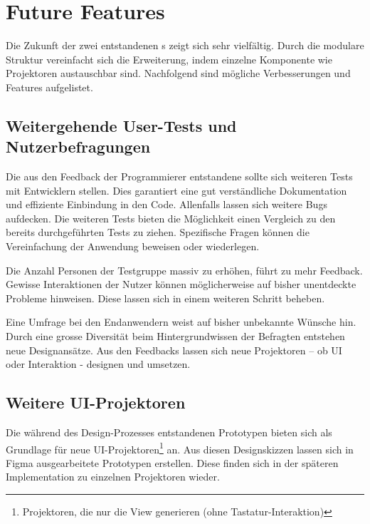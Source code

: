 \section{Future Features}
\label{sec:future}

Die Zukunft der zwei entstandenen s zeigt sich sehr vielfältig. 
Durch die modulare Struktur vereinfacht sich die Erweiterung, indem einzelne Komponente wie Projektoren austauschbar sind. 
Nachfolgend sind mögliche Verbesserungen und Features aufgelistet. 


\subsection{Weitergehende User-Tests und Nutzerbefragungen}
\label{sec:moreUserTests}

Die aus den Feedback der Programmierer entstandene  sollte sich weiteren Tests mit Entwicklern stellen. 
Dies garantiert eine gut verständliche Dokumentation und effiziente Einbindung in den Code. 
Allenfalls lassen sich weitere Bugs aufdecken. 
Die weiteren Tests bieten die Möglichkeit einen Vergleich zu den bereits durchgeführten Tests zu ziehen. 
Spezifische Fragen können die Vereinfachung der Anwendung beweisen oder wiederlegen. 

Die Anzahl Personen der Testgruppe massiv zu erhöhen, führt zu mehr Feedback. 
Gewisse Interaktionen der Nutzer können möglicherweise auf bisher unentdeckte Probleme hinweisen. 
Diese lassen sich in einem weiteren Schritt beheben. 

Eine Umfrage bei den Endanwendern weist auf bisher unbekannte Wünsche hin. 
Durch eine grosse Diversität beim Hintergrundwissen der Befragten entstehen neue Designansätze. 
Aus den Feedbacks lassen sich neue Projektoren – ob UI oder Interaktion - designen und umsetzen. 


\subsection{Weitere UI-Projektoren}
\label{sec:moreUi}

Die während des Design-Prozesses entstandenen Prototypen bieten sich als Grundlage für neue UI-Projektoren\footnote{
    Projektoren, die nur die View generieren (ohne Tastatur-Interaktion)
} an. 
Aus diesen Designskizzen lassen sich in Figma ausgearbeitete Prototypen erstellen. 
Diese finden sich in der späteren Implementation zu einzelnen Projektoren wieder. 

